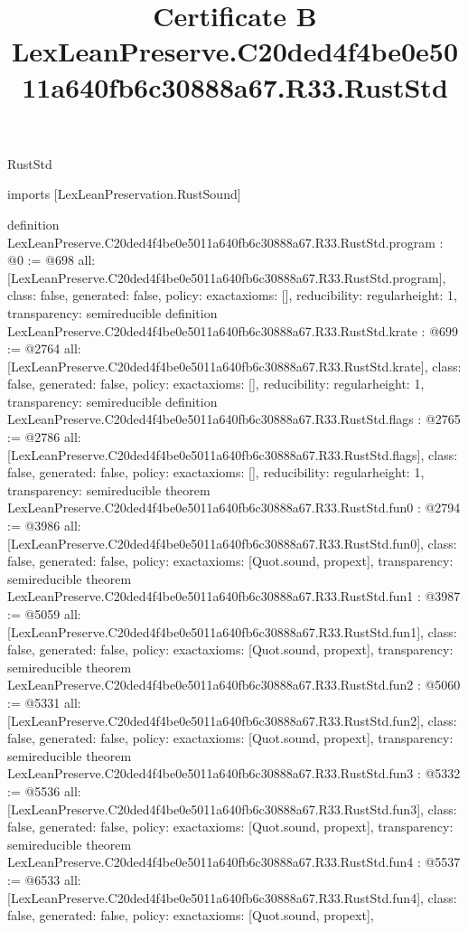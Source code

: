\begin{lexlean}{RustStd}
\title{Certificate B LexLeanPreserve.C20ded4f4be0e5011a640fb6c30888a67.R33.RustStd}
\begin{coremodule}
imports [LexLeanPreservation.RustSound]

definition LexLeanPreserve.C20ded4f4be0e5011a640fb6c30888a67.R33.RustStd.program : @0 := @698 {
  all: [LexLeanPreserve.C20ded4f4be0e5011a640fb6c30888a67.R33.RustStd.program],
  class: false,
  generated: false,
  policy: exact{axioms: []},
  reducibility: regular{height: 1},
  transparency: semireducible
}
definition LexLeanPreserve.C20ded4f4be0e5011a640fb6c30888a67.R33.RustStd.krate : @699 := @2764 {
  all: [LexLeanPreserve.C20ded4f4be0e5011a640fb6c30888a67.R33.RustStd.krate],
  class: false,
  generated: false,
  policy: exact{axioms: []},
  reducibility: regular{height: 1},
  transparency: semireducible
}
definition LexLeanPreserve.C20ded4f4be0e5011a640fb6c30888a67.R33.RustStd.flags : @2765 := @2786 {
  all: [LexLeanPreserve.C20ded4f4be0e5011a640fb6c30888a67.R33.RustStd.flags],
  class: false,
  generated: false,
  policy: exact{axioms: []},
  reducibility: regular{height: 1},
  transparency: semireducible
}
theorem LexLeanPreserve.C20ded4f4be0e5011a640fb6c30888a67.R33.RustStd.fun0 : @2794 := @3986 {
  all: [LexLeanPreserve.C20ded4f4be0e5011a640fb6c30888a67.R33.RustStd.fun0],
  class: false,
  generated: false,
  policy: exact{axioms: [Quot.sound, propext]},
  transparency: semireducible
}
theorem LexLeanPreserve.C20ded4f4be0e5011a640fb6c30888a67.R33.RustStd.fun1 : @3987 := @5059 {
  all: [LexLeanPreserve.C20ded4f4be0e5011a640fb6c30888a67.R33.RustStd.fun1],
  class: false,
  generated: false,
  policy: exact{axioms: [Quot.sound, propext]},
  transparency: semireducible
}
theorem LexLeanPreserve.C20ded4f4be0e5011a640fb6c30888a67.R33.RustStd.fun2 : @5060 := @5331 {
  all: [LexLeanPreserve.C20ded4f4be0e5011a640fb6c30888a67.R33.RustStd.fun2],
  class: false,
  generated: false,
  policy: exact{axioms: [Quot.sound, propext]},
  transparency: semireducible
}
theorem LexLeanPreserve.C20ded4f4be0e5011a640fb6c30888a67.R33.RustStd.fun3 : @5332 := @5536 {
  all: [LexLeanPreserve.C20ded4f4be0e5011a640fb6c30888a67.R33.RustStd.fun3],
  class: false,
  generated: false,
  policy: exact{axioms: [Quot.sound, propext]},
  transparency: semireducible
}
theorem LexLeanPreserve.C20ded4f4be0e5011a640fb6c30888a67.R33.RustStd.fun4 : @5537 := @6533 {
  all: [LexLeanPreserve.C20ded4f4be0e5011a640fb6c30888a67.R33.RustStd.fun4],
  class: false,
  generated: false,
  policy: exact{axioms: [Quot.sound, propext]},
}
\end{coremodule}
\end{lexlean}
